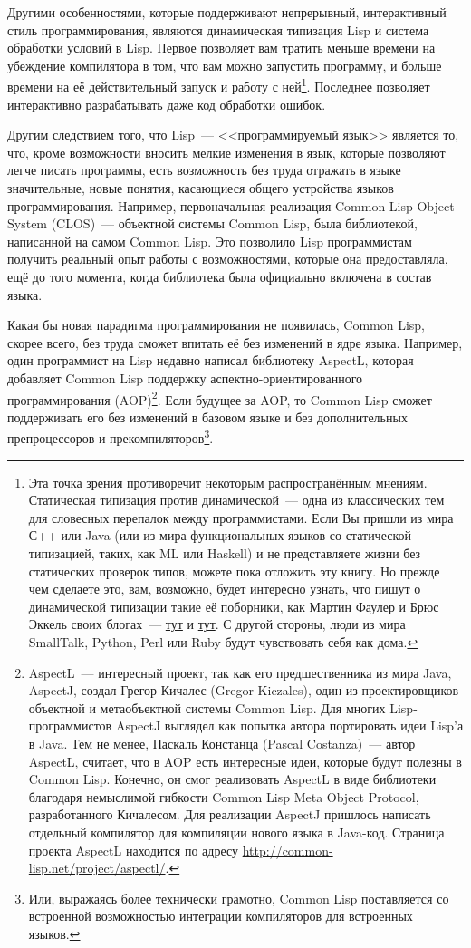 Другими особенностями, которые поддерживают непрерывный, интерактивный стиль
программирования, являются динамическая типизация Lisp и система обработки условий в
Lisp. Первое позволяет вам тратить меньше времени на убеждение компилятора в том, что вам
можно запустить программу, и больше времени на её действительный запуск и работу с
ней\footnote{Эта точка зрения противоречит некоторым распространённым мнениям. Статическая
  типизация против динамической~--- одна из классических тем для словесных перепалок между
  программистами. Если Вы пришли из мира С++ или Java (или из мира функциональных языков
  со статической типизацией, таких, как ML или Haskell) и не представляете жизни без
  статических проверок типов, можете пока отложить эту книгу. Но прежде чем сделаете это,
  вам, возможно, будет интересно узнать, что пишут о динамической типизации такие её
  поборники, как Мартин Фаулер и Брюс Эккель своих блогах~---
  \href{http://www.artima.com/weblogs/viewpost.jsp?thread=4639}{тут} и
  \href{http://www.mindview.net/WebLog/log-0025}{тут}. С другой стороны, люди из мира
  SmallTalk, Python, Perl или Ruby будут чувствовать себя как дома.}. Последнее позволяет
интерактивно разрабатывать даже код обработки ошибок.

Другим следствием того, что Lisp~--- <<программируемый язык>> является то, что, кроме
возможности вносить мелкие изменения в язык, которые позволяют легче писать программы,
есть возможность без труда отражать в языке значительные, новые понятия, касающиеся общего
устройства языков программирования. Например, первоначальная реализация Common Lisp Object
System (CLOS)~--- объектной системы Common Lisp, была библиотекой, написанной на самом
Common Lisp. Это позволило Lisp программистам получить реальный опыт работы с
возможностями, которые она предоставляла, ещё до того момента, когда библиотека была
официально включена в состав языка.

Какая бы новая парадигма программирования не появилась, Common Lisp, скорее всего, без
труда сможет впитать её без изменений в ядре языка. Например, один программист на Lisp
недавно написал библиотеку AspectL, которая добавляет Common Lisp поддержку
аспектно-ориентированного программирования (AOP)\footnote{AspectL~--- интересный проект,
  так как его предшественника из мира Java, AspectJ, создал Грегор Кичалес (Gregor
  Kiczales), один из проектировщиков объектной и метаобъектной системы Common Lisp. Для
  многих Lisp-программистов AspectJ выглядел как попытка автора портировать идеи Lisp'а в
  Java. Тем не менее, Паскаль Констанца (Pascal Costanza)~--- автор AspectL, считает, что
  в AOP есть интересные идеи, которые будут полезны в Common Lisp. Конечно, он смог
  реализовать AspectL в виде библиотеки благодаря немыслимой гибкости Common Lisp Meta
  Object Protocol, разработанного Кичалесом. Для реализации AspectJ пришлось написать
  отдельный компилятор для компиляции нового языка в Java-код. Страница проекта AspectL
  находится по адресу \url{http://common-lisp.net/project/aspectl/}.}. Если будущее за
AOP, то Common Lisp сможет поддерживать его без изменений в базовом языке и без
дополнительных препроцессоров и прекомпиляторов\footnote{Или, выражаясь более технически
  грамотно, Common Lisp поставляется со встроенной возможностью интеграции компиляторов
  для встроенных языков.}.

